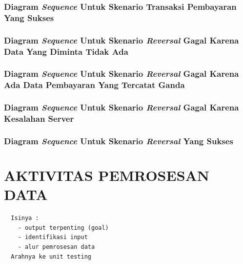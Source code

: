 \documentclass[pdftex,12pt, oneside]{article}
\begin{document}
\subsubsection{Diagram \textit{Sequence} Untuk Skenario Transaksi Pembayaran Yang Sukses}
\subsubsection{Diagram \textit{Sequence} Untuk Skenario \textit{Reversal} Gagal Karena Data Yang Diminta Tidak Ada}
\subsubsection{Diagram \textit{Sequence} Untuk Skenario \textit{Reversal} Gagal Karena Ada Data Pembayaran Yang Tercatat Ganda}
\subsubsection{Diagram \textit{Sequence} Untuk Skenario \textit{Reversal} Gagal Karena Kesalahan Server}
\subsubsection{Diagram \textit{Sequence} Untuk Skenario \textit{Reversal} Yang Sukses}


\section{AKTIVITAS PEMROSESAN DATA}

\begin{verbatim}
  Isinya :
    - output terpenting (goal)
    - identifikasi input 
    - alur pemrosesan data
  Arahnya ke unit testing
\end{verbatim}
\end{document}
